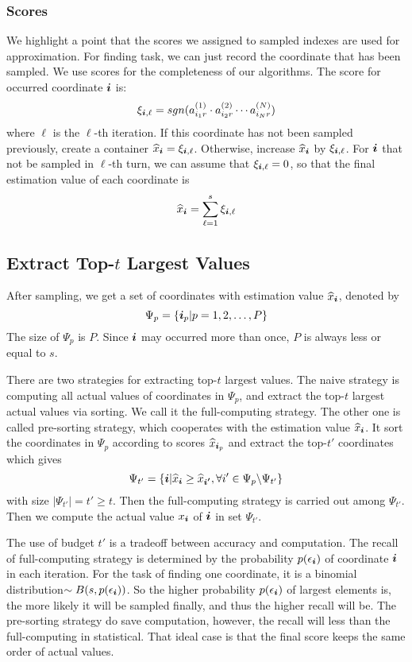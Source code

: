 \documentclass[letterpaper]{article}
\newcommand{\Sca}[3]{{#1}^{(#2)}_{i_#2#3}}%
\newcommand{\anr}[2]{\Sca{a}{#1}{#2}}
\newcommand{\score}[1]{\xi_{\V{i},#1}}
\newcommand{\V}[1]{{\boldsymbol{{\MakeLowercase{#1}}}}}
\newcommand{\AlgLines}[3]{lines~\ref{line:#2}--\ref{line:#3} of Algorithm~\ref{alg:#1}}
\newcommand{\predx}{\widehat{x}_{\V{i}}}
\begin{document}
\subsubsection{Scores}
We highlight a point that the scores we assigned to sampled indexes are used for approximation.
For finding task, we can just record the coordinate that has been sampled.
We use scores for the completeness of our algorithms.
The score for occurred coordinate $\V{i} $ is:
\[
\score{\ell}  = sgn(\anr{1}{r}\cdot\anr{2}{r}\cdots\anr{N}{r})
\]
where $\ell$ is the $\ell$-th iteration.
If this coordinate has not been sampled previously,
create a container $\predx = \score{\ell}$.
Otherwise, increase $\predx$ by $\score{\ell}$.
For $\V{i}$ that not be sampled in $\ell$-th turn,
we can assume that $\score{\ell}=0$,
so that the final estimation value of each coordinate is
\begin{equation}\label{eq:score}
\predx = \sum_{\ell=1}^{s} \score{\ell}
\end{equation}

\subsection{Extract Top-$t$ Largest Values}
After sampling, we get a set of coordinates with estimation value $\predx$,
denoted by
\[
    \Psi_p = \{\V{i}_p|p = 1,2,\ldots,P\}
\]
The size of $\Psi_p$ is $P$.
Since $\V{i}$ may occurred more than once, $P$ is always less or equal to $s$.

There are two strategies for extracting top-$t$ largest values.
The naive strategy is computing all actual values of coordinates in $\Psi_p$,
and extract the top-$t$ largest actual values via sorting.
We call it the full-computing strategy.
The other one is called pre-sorting strategy,
which cooperates with the estimation value $\predx$.
It sort the coordinates in $\Psi_p$ according to scores $\widehat{x}_{\V{i}_p}$
and extract the top-$t'$ coordinates which gives
\[
    \Psi_{t'} = \{ \V{i} | \predx \geq \widehat{x}_{\V{i'}},
                           \forall i'\in \Psi_{p} \backslash \Psi_{t'}
                \}
\]  with size $|\Psi_{t'}| = t'\geq t$.
Then the full-computing strategy is carried out among $\Psi_{t'}$.
Then we compute the actual value $x_{\V{i}}$ of $\V{i}$ in set $\Psi_{t'}$.

The use of budget $t'$ is a tradeoff between accuracy and computation.
The recall of full-computing strategy is determined by
the probability $p(\epsilon_{\V{i}})$ of coordinate $\V{i}$ in each iteration.
For the task of finding one coordinate, it is a binomial distribution$\sim B(s,p(\epsilon_{\V{i}}))$.
So the higher probability $p(\epsilon_{\V{i}})$ of largest elements is,
the more likely it will be sampled finally,
and thus the higher recall will be.
The pre-sorting strategy do save computation,
however, the recall will less than the full-computing in statistical.
That ideal case is that the final score keeps the same order of actual values.
\end{document}
